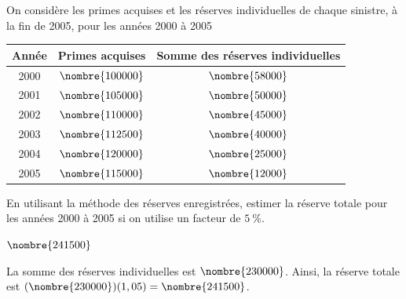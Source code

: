 \begin{exercice}
  On considère les primes acquises et les réserves individuelles de
  chaque sinistre, à la fin de 2005, pour les années 2000 à 2005
  \begin{center}
    \begin{tabular}{|c | c c|}\hline
      Année & Primes acquises & Somme des réserves individuelles \\ \hline
      2000 & $\nombre{100000}$ & $\nombre{58000}$\\
      2001 & $\nombre{105000}$ & $\nombre{50000}$\\
      2002 & $\nombre{110000}$ & $\nombre{45000}$\\
      2003 & $\nombre{112500}$ & $\nombre{40000}$\\
      2004 & $\nombre{120000}$ & $\nombre{25000}$\\
      2005 & $\nombre{115000}$ & $\nombre{12000}$ \\ \hline
    \end{tabular}
  \end{center}
  En utilisant la méthode des réserves enregistrées, estimer la
  réserve totale pour les années 2000 à 2005 si on utilise un facteur
  de $5~\%$.
  \begin{rep}
    $\nombre{241500}$
  \end{rep}
  \begin{sol}
    La somme des réserves individuelles est $\nombre{230000}$.
    Ainsi, la réserve totale est
    $(\nombre{230000})(1,05) = \nombre{241500}$.
  \end{sol}
\end{exercice}

